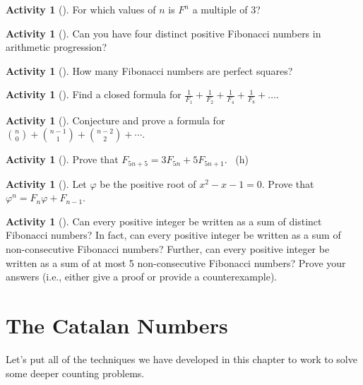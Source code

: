 \documentclass[10pt,]{book}
\theoremstyle{plain}
\theoremstyle{definition}
\theoremstyle{definition}
\theoremstyle{definition}
\newtheorem{activity}[project]{Activity}
\numberwithin{equation}{chapter}
\begin{document}
\begin{activity}[]\label{activity-157}
\hypertarget{p-978}{}%
For which values of \(n\) is \(F^{n}\) a multiple of 3?%
\end{activity}
\begin{activity}[]\label{activity-158}
\hypertarget{p-979}{}%
Can you have four distinct positive Fibonacci numbers in arithmetic progression?%
\end{activity}
\begin{activity}[]\label{activity-159}
\hypertarget{p-980}{}%
How many Fibonacci numbers are perfect squares?%
\end{activity}
\begin{activity}[]\label{activity-160}
\hypertarget{p-981}{}%
Find a closed formula for \(\frac{1}{F_{1}} + \frac{1}{F_{2}} + \frac{1}{F_{4}} + \frac{1}{F_{8}} + \ldots.\)%
\end{activity}
\begin{activity}[]\label{activity-161}
\hypertarget{p-982}{}%
Conjecture and prove a formula for \(\binom{n}{0} + \binom{n-1}{1} + \binom{n-2}{2} + \cdots\).%
\end{activity}
\begin{activity}[]\label{activity-162}
\hypertarget{p-983}{}%
Prove that \(F_{5n + 5} = 3F_{5n} + 5F_{5n + 1}\).%
~{\tiny (h)}\end{activity}
\begin{activity}[]\label{activity-163}
\hypertarget{p-985}{}%
Let \(\varphi\) be the positive root of \(x^{2} - x - 1 = 0\). Prove that \(\varphi^{n} = F_{n}\varphi + F_{n - 1}\).%
\end{activity}
\begin{activity}[]\label{activity-164}
\hypertarget{p-986}{}%
Can every positive integer be written as a sum of distinct Fibonacci numbers?  In fact, can every positive integer be written as a sum of non-consecutive Fibonacci numbers?  Further, can every positive integer be written as a sum of at most 5 non-consecutive Fibonacci numbers?  Prove your answers (i.e., either give a proof or provide a counterexample).%
\end{activity}
\typeout{************************************************}
\typeout{************************************************}
\section[{The Catalan Numbers}]{The Catalan Numbers}\label{sec_basic-catalan}
\hypertarget{p-987}{}%
Let's put all of the techniques we have developed in this chapter to work to solve some deeper counting problems.%
\typeout{************************************************}
\typeout{************************************************}
\end{document}
